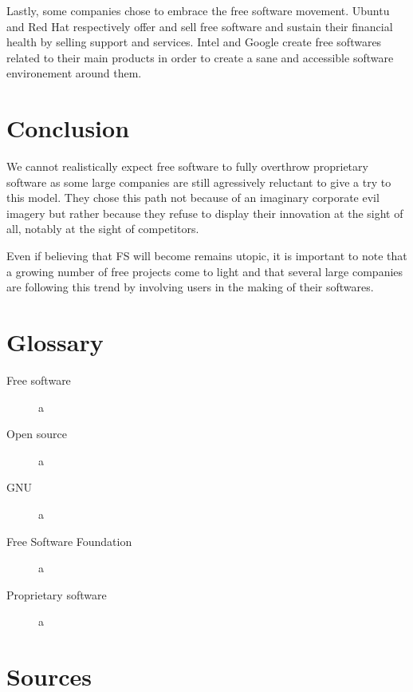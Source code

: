 \documentclass[12pt]{article}
\begin{document}
Lastly, some companies chose to embrace the free software
movement. Ubuntu and Red Hat respectively offer and sell free software
and sustain their financial health by selling support and
services. Intel and Google create free softwares related to their main
products in order to create a sane and accessible software
environement around them.

\section*{Conclusion}

We cannot realistically expect free software to fully overthrow proprietary software
as some large companies are still agressively reluctant to give a try to this model.
They chose this path not because of an imaginary corporate evil imagery but rather because
they refuse to display their innovation at the sight of all, notably at the sight of competitors.

Even if believing that FS will become remains utopic, it is important to note
that a growing number of free projects come to light and that several large companies
are following this trend by involving users in the making of their softwares.

\section*{Glossary}

\begin{description}
  \item[Free software]{a}
  \item[Open source]{a}
  \item[GNU]{a}
  \item[Free Software Foundation]{a}
  \item[Proprietary software]{a}
\end{description}

\section*{Sources}



\end{document}
